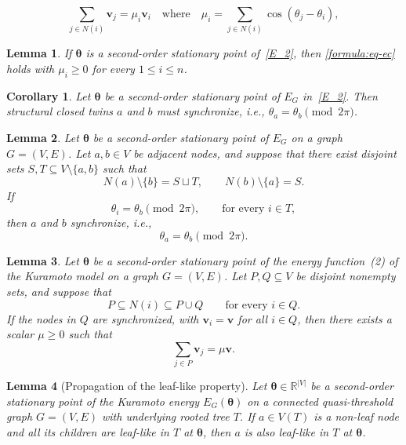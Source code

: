 \documentclass[10pt,a4paper]{amsart}
\newtheorem{lemma}{Lemma}
\newtheorem{corollary}{Corollary}
\begin{document}
\begin{equation}\label{formula:eq-ec}
\sum_{j\in N(i)} \boldsymbol v_j = \mu_i \boldsymbol v_i\quad\text{where}\quad \mu_i=\sum_{j\in N(i)}\cos(\theta_j-\theta_i),
\end{equation}

\begin{lemma}\label{stable-eq}
If $\boldsymbol{\theta}$ is a second-order stationary point of~\eqref{E_2},
then \eqref{formula:eq-ec} holds with $\mu_i\ge 0$ for every $1\le i\le n$.
\end{lemma}

\begin{corollary}\label{stable-closed-twins}
Let $\boldsymbol{\theta}$ be a second-order stationary point of $E_G$ in~\eqref{E_2}.
Then structural closed twins $a$ and $b$ must synchronize, i.e., $\theta_a=\theta_b \pmod{2\pi}$.
\end{corollary}

\begin{lemma}\label{pairwise-no-nauty-extra-node}
Let $\boldsymbol{\theta}$ be a second-order stationary point of $E_G$ on a graph
$G=(V,E)$.
Let $a,b\in V$ be adjacent nodes, and suppose that there exist disjoint sets
$S,T\subseteq V\setminus\{a,b\}$ such that
\[
N(a)\setminus\{b\}=S\sqcup T,
\qquad
N(b)\setminus\{a\}=S.
\]
If
\[
\theta_i=\theta_b \pmod{2\pi}, \qquad\text{for every } i\in T,
\]
then $a$ and $b$ synchronize, i.e.,
\[
\theta_a=\theta_b \pmod{2\pi}.
\]
\end{lemma}

\begin{lemma}\label{lem:opentwins}
Let $\boldsymbol\theta$ be a second-order stationary point of the energy
function~(2) of the Kuramoto model on a graph $G=(V,E)$.
Let $P,Q\subseteq V$ be disjoint nonempty sets,
and suppose that
\[
    P\subseteq N(i)\subseteq P\cup Q
    \qquad \text{for every } i\in Q.
\]
If the nodes in $Q$ are synchronized, with
$\mathbf{v}_i=\mathbf{v}$ for all $i\in Q$, then there exists
a scalar $\mu\geq 0$ such that
\[
    \sum_{j\in P}\mathbf{v}_j=\mu\mathbf{v}.
\]
\end{lemma}

\begin{lemma}[Propagation of the leaf-like property]
\label{lemma:leaflike}
Let $\boldsymbol{\theta}\in\mathbb{R}^{|V|}$ be a second-order
stationary point of the Kuramoto energy $E_G(\boldsymbol{\theta})$ on a connected
quasi-threshold graph $G=(V,E)$ with underlying rooted tree $T$.
If $a\in V(T)$ is a non-leaf node and all its children are
leaf-like in $T$ at $\boldsymbol{\theta}$, then $a$ is also
leaf-like in $T$ at $\boldsymbol{\theta}$.
\end{lemma}
\end{document}
